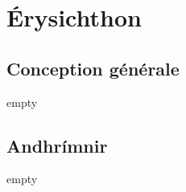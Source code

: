 \documentclass{backend/backend}
\begin{document}
\section{Érysichthon}

\subsection{Conception générale}
\begin{frame}{empty}
    
\end{frame}
\subsection{Andhrímnir}
\begin{frame}{empty}
    
\end{frame}
\end{document}
